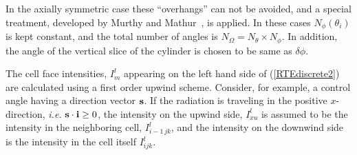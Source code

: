 \documentclass[11pt]{book}
\begin{document}
In the axially symmetric case these ``overhangs'' can not be avoided, and a
special treatment, developed by Murthy and Mathur~\cite{Murthy}, is
applied. In these cases $N_{\phi}(\theta_i)$ is kept constant, and
the total number of angles is $N_{\Omega} = N_{\theta} \times
N_{\phi}$. In addition, the angle of the vertical slice of the cylinder is
chosen to be same as $\delta\phi$.

The cell face intensities, $I_m^l$ appearing on the left hand side of
(\ref{RTEdiscrete2}) are calculated using a first order
upwind scheme. Consider, for example, a control angle having a
direction vector ${\bf s}$. If the radiation is traveling in the positive
$x$-direction, {\em i.e.} ${\bf s}\cdot {\bf i} \geq 0$, the intensity on the
upwind side, $I_{xu}^l$ is assumed to be
the intensity in the neighboring cell, $I_{i-1\,jk}^l$,
and the intensity on the downwind
side is the intensity in the cell itself $I_{ijk}^l$.
\end{document}
